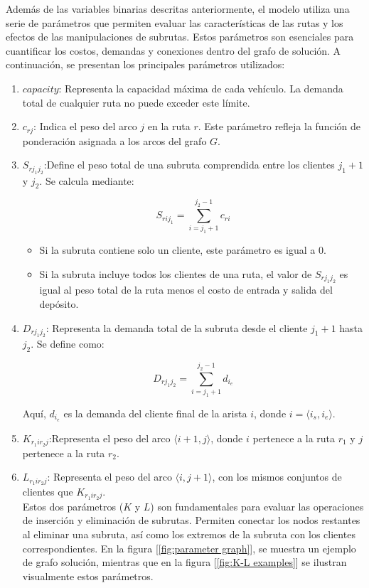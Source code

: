 \documentclass{article}
\begin{document}
Además de las variables binarias descritas anteriormente, el modelo utiliza una serie de parámetros que permiten evaluar las características de las rutas y los efectos de las manipulaciones de subrutas. Estos parámetros son esenciales para cuantificar los costos, demandas y conexiones dentro del grafo de solución. A continuación, se presentan los principales parámetros utilizados:

\begin{enumerate}
\item{$capacity$: Representa la capacidad máxima de cada vehículo. La demanda total de cualquier ruta no puede exceder este límite.}
\item{$c_{rj}$: Indica el peso del arco $j$ en la ruta $r$. Este parámetro refleja la función de ponderación asignada a los arcos del grafo $G$.}

\item{$S_{rj_1j_2}$:Define el peso total de una subruta comprendida entre los clientes $j_1+1$ y $j_2$. Se calcula mediante:}

\[
S_{rij_1}=\sum\limits_{i=j_1+1}^{j_2-1} c_{ri} 
\]
\begin{itemize}
\item
Si la subruta contiene solo un cliente, este parámetro es igual a 0.
\item
Si la subruta incluye todos los clientes de una ruta, el valor de $S_{rj_1j_2}$ es igual al peso total de la ruta menos el costo de entrada y salida del depósito.
\end{itemize}

\item {$D_{rj_1j_2}$: Representa la demanda total de la subruta desde el cliente $j_1+1$ hasta $j_2$. Se define como:}

\[
D_{rj_1j_2}=\sum\limits_{i=j_1+1}^{j_2-1} d_{i_e} 
\]

Aquí, $d_{i_e}$ es la demanda del cliente final de la arista $i$, donde $i = \langle i_s, i_e \rangle$.

\item{$K_{r_1ir_2j}$:Representa el peso del arco $\langle i+1, j \rangle$, donde $i$ pertenece a la ruta $r_1$ y $j$ pertenece a la ruta $r_2$.}
\item{$L_{r_1ir_2j}$: Representa el peso del arco $\langle i, j+1 \rangle$, con los mismos conjuntos de clientes que $K_{r_1ir_2j}$.}\\

Estos dos parámetros ($K$ y $L$) son fundamentales para evaluar las operaciones de inserción y eliminación de subrutas. Permiten conectar los nodos restantes al eliminar una subruta, así como los extremos de la subruta con los clientes correspondientes. En la figura [\ref{fig:parameter graph}], se muestra un ejemplo de grafo solución, mientras que en la figura [\ref{fig:K-L examples}] se ilustran visualmente estos parámetros.


\end{enumerate}
\end{document}
